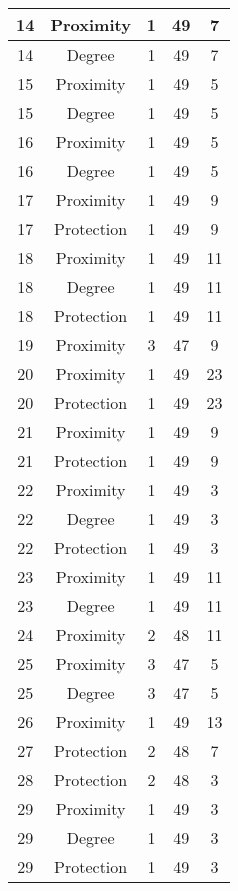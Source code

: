\documentclass[results.tex]{subfiles}
\begin{document}
\begin{center}
\begin{tabular}{| c || c | c | c | c |}
    \hline
    14 & Proximity & 1 & 49 & 7 \\ 
    \hline
    14 & Degree & 1 & 49 & 7 \\ 
    \hline
    15 & Proximity & 1 & 49 & 5 \\ 
    \hline
    15 & Degree & 1 & 49 & 5 \\ 
    \hline
    16 & Proximity & 1 & 49 & 5 \\ 
    \hline
    16 & Degree & 1 & 49 & 5 \\ 
    \hline
    17 & Proximity & 1 & 49 & 9 \\ 
    \hline
    17 & Protection & 1 & 49 & 9 \\ 
    \hline
    18 & Proximity & 1 & 49 & 11 \\ 
    \hline
    18 & Degree & 1 & 49 & 11 \\ 
    \hline
    18 & Protection & 1 & 49 & 11 \\ 
    \hline
    19 & Proximity & 3 & 47 & 9 \\ 
    \hline
    20 & Proximity & 1 & 49 & 23 \\ 
    \hline
    20 & Protection & 1 & 49 & 23 \\ 
    \hline
    21 & Proximity & 1 & 49 & 9 \\ 
    \hline
    21 & Protection & 1 & 49 & 9 \\ 
    \hline
    22 & Proximity & 1 & 49 & 3 \\ 
    \hline
    22 & Degree & 1 & 49 & 3 \\ 
    \hline
    22 & Protection & 1 & 49 & 3 \\ 
    \hline
    23 & Proximity & 1 & 49 & 11 \\ 
    \hline
    23 & Degree & 1 & 49 & 11 \\ 
    \hline
    24 & Proximity & 2 & 48 & 11 \\ 
    \hline
    25 & Proximity & 3 & 47 & 5 \\ 
    \hline
    25 & Degree & 3 & 47 & 5 \\ 
    \hline
    26 & Proximity & 1 & 49 & 13 \\ 
    \hline
    27 & Protection & 2 & 48 & 7 \\ 
    \hline
    28 & Protection & 2 & 48 & 3 \\ 
    \hline
    29 & Proximity & 1 & 49 & 3 \\ 
    \hline
    29 & Degree & 1 & 49 & 3 \\ 
    \hline
    29 & Protection & 1 & 49 & 3 \\ 

\end{tabular}
\end{center}
\end{document}
